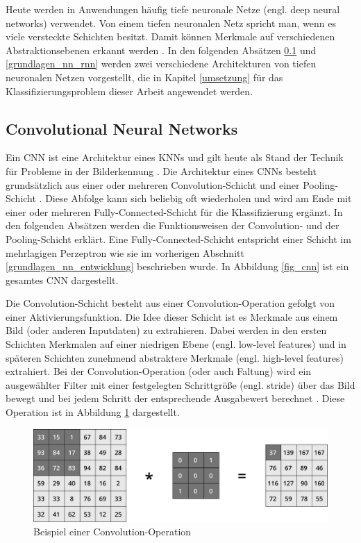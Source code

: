 Heute werden in Anwendungen häufig tiefe neuronale Netze (engl. deep neural networks) verwendet. Von einem tiefen neuronalen Netz spricht man, wenn es viele versteckte Schichten besitzt. Damit können Merkmale auf verschiedenen Abstraktionsebenen erkannt werden \cite{lecun2015deep}. In den folgenden Absätzen \ref{grundlagen_nn_cnn} und \ref{grundlagen_nn_rnn} werden zwei verschiedene Architekturen von tiefen neuronalen Netzen vorgestellt, die in Kapitel \ref{umsetzung} für das Klassifizierungsproblem dieser Arbeit angewendet werden.


\subsection{Convolutional Neural Networks}
\label{grundlagen_nn_cnn}

Ein \acf{CNN} ist eine Architektur eines \acp{KNN} und gilt heute als Stand der Technik für Probleme in der Bilderkennung \cite{krizhevsky2012imagenet}. Die Architektur eines \acp{CNN} besteht grundsätzlich aus einer oder mehreren Convolution-Schicht und einer Pooling-Schicht \cite{lecun2010convolutional}. Diese Abfolge kann sich beliebig oft wiederholen und wird am Ende mit einer oder mehreren Fully-Connected-Schicht für die Klassifizierung ergänzt. In den folgenden Absätzen werden die Funktionsweisen der Convolution- und der Pooling-Schicht erklärt. Eine Fully-Connected-Schicht entspricht einer Schicht im mehrlagigen Perzeptron wie sie im vorherigen Abschnitt \ref{grundlagen_nn_entwicklung} beschrieben wurde. In Abbildung \ref{fig_cnn} ist ein gesamtes \ac{CNN} dargestellt.

Die Convolution-Schicht besteht aus einer Convolution-Operation gefolgt von einer Aktivierungsfunktion. Die Idee dieser Schicht ist es Merkmale aus einem Bild (oder anderen Inputdaten) zu extrahieren. Dabei werden in den ersten Schichten Merkmalen auf einer niedrigen Ebene (engl. low-level features) und in späteren Schichten zunehmend abstraktere Merkmale (engl. high-level features) extrahiert. Bei der Convolution-Operation (oder auch Faltung) wird ein ausgewählter Filter mit einer festgelegten Schrittgröße (engl. stride) über das Bild bewegt und bei jedem Schritt der entsprechende Ausgabewert berechnet \cite{lecun1998cnn}. Diese Operation ist in Abbildung \ref{fig_conv_operation} dargestellt.

\begin{figure}[h]
\centering
\includegraphics[scale=0.4]{images/conv_operation.pdf}
\caption{Beispiel einer Convolution-Operation}
\label{fig_conv_operation}
\end{figure}

